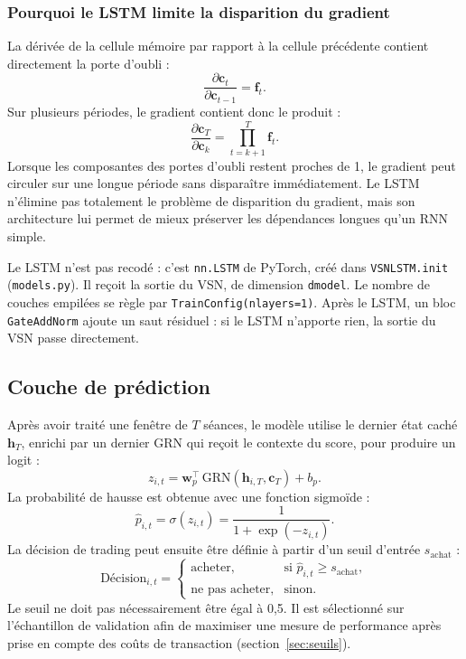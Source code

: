 \documentclass[11pt,a4paper]{article}
\renewcommand{\_}{\usorig\allowbreak}   %
\newcommand{\f}[1]{\texttt{#1}}        %
\begin{document}
\subsubsection{Pourquoi le LSTM limite la disparition du gradient}
La dérivée de la cellule mémoire par rapport à la cellule précédente contient
directement la porte d'oubli :
\[
  \frac{\partial\bm c_t}{\partial\bm c_{t-1}} = \bm f_t.
\]
Sur plusieurs périodes, le gradient contient donc le produit :
\[
  \frac{\partial\bm c_T}{\partial\bm c_k} = \prod_{t=k+1}^{T}\bm f_t.
\]
Lorsque les composantes des portes d'oubli restent proches de 1, le gradient peut
circuler sur une longue période sans disparaître immédiatement. Le LSTM n'élimine pas
totalement le problème de disparition du gradient, mais son architecture lui permet de
mieux préserver les dépendances longues qu'un RNN simple.

\begin{danslecode}
Le LSTM n'est pas recodé : c'est \f{nn.LSTM} de PyTorch, créé dans \f{VSNLSTM.\_\_init\_\_}
(\f{models.py}). Il reçoit la sortie du VSN, de dimension \f{d\_model}. Le nombre de
couches empilées se règle par \f{TrainConfig(n\_layers=1)}. Après le LSTM, un bloc
\f{GateAddNorm} ajoute un saut résiduel : si le LSTM n'apporte rien, la sortie du VSN
passe directement.
\end{danslecode}

\subsection{Couche de prédiction}
Après avoir traité une fenêtre de $T$ séances, le modèle utilise le dernier état caché
$\bm h_T$, enrichi par un dernier GRN qui reçoit le contexte du score, pour produire un
logit :
\[
  z_{i,t} = \bm w_p^\top\,\mathrm{GRN}(\bm h_{i,T},\bm c_T) + b_p.
\]
La probabilité de hausse est obtenue avec une fonction sigmoïde :
\[
  \hat p_{i,t} = \sigma(z_{i,t}) = \frac{1}{1+\exp(-z_{i,t})}.
\]
La décision de trading peut ensuite être définie à partir d'un seuil d'entrée $s_{\text{achat}}$ :
\[
  \text{Décision}_{i,t} = \begin{cases}\text{acheter}, & \text{si } \hat p_{i,t}\ge s_{\text{achat}},\\
  \text{ne pas acheter}, & \text{sinon.}\end{cases}
\]
Le seuil ne doit pas nécessairement être égal à 0,5. Il est sélectionné sur l'échantillon
de validation afin de maximiser une mesure de performance après prise en compte des
coûts de transaction (section~\ref{sec:seuils}).
\end{document}
